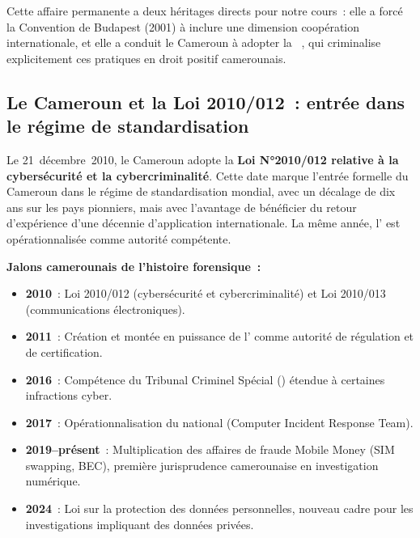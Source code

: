 \medskip

Cette affaire permanente a deux héritages directs pour notre cours~: elle a
forcé la Convention de Budapest (2001) à inclure une dimension coopération
internationale, et elle a conduit le Cameroun à adopter la
~\cite{cameroun2010a}, qui criminalise explicitement ces pratiques en droit
positif camerounais.

\subsection{Le Cameroun et la Loi 2010/012~: entrée dans le régime de standardisation}

Le 21~décembre~2010, le Cameroun adopte la \textbf{Loi N°2010/012 relative
à la cybersécurité et la cybercriminalité}. Cette date marque l'entrée
formelle du Cameroun dans le régime de standardisation mondial, avec un
décalage de dix ans sur les pays pionniers, mais avec l'avantage de
bénéficier du retour d'expérience d'une décennie d'application internationale.
La même année, l' est opérationnalisée comme autorité compétente.

\begin{boxjuris}
\textbf{Jalons camerounais de l'histoire forensique~:}
\begin{itemize}
    \item \textbf{2010}~: Loi 2010/012 (cybersécurité et cybercriminalité)
          et Loi 2010/013~\cite{cameroun2010b} (communications électroniques).
    \item \textbf{2011}~: Création et montée en puissance de l'
          comme autorité de régulation et de certification.
    \item \textbf{2016}~: Compétence du Tribunal Criminel Spécial ()
          étendue à certaines infractions cyber.
    \item \textbf{2017}~: Opérationnalisation du  national
          (Computer Incident Response Team).
    \item \textbf{2019--présent}~: Multiplication des affaires de fraude
          Mobile Money (SIM swapping, BEC), première jurisprudence
          camerounaise en investigation numérique.
    \item \textbf{2024}~: Loi sur la protection des données personnelles,
          nouveau cadre pour les investigations impliquant des données privées.
\end{itemize}
\end{boxjuris}

